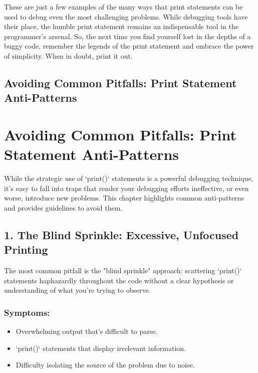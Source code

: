 \documentclass{article}
\begin{document}
These are just a few examples of the many ways that print statements can be used to debug even the most challenging problems. While debugging tools have their place, the humble print statement remains an indispensable tool in the programmer's arsenal. So, the next time you find yourself lost in the depths of a buggy code, remember the legends of the print statement and embrace the power of simplicity. When in doubt, print it out.

\newpage

\section*{Avoiding Common Pitfalls: Print Statement Anti-Patterns} %
\label{chapter-1-8-Avoiding_Common_Pitfalls__Print_Statemen}

\chapter{Avoiding Common Pitfalls: Print Statement Anti-Patterns}

While the strategic use of `print()` statements is a powerful debugging technique, it's easy to fall into traps that render your debugging efforts ineffective, or even worse, introduce new problems. This chapter highlights common anti-patterns and provides guidelines to avoid them.

\section*{1. The Blind Sprinkle: Excessive, Unfocused Printing}

The most common pitfall is the "blind sprinkle" approach: scattering `print()` statements haphazardly throughout the code without a clear hypothesis or understanding of what you're trying to observe.

\subsection*{Symptoms:}

\begin{itemize}
    \item Overwhelming output that's difficult to parse.
    \item `print()` statements that display irrelevant information.
    \item Difficulty isolating the source of the problem due to noise.
\end{itemize}
\end{document}
